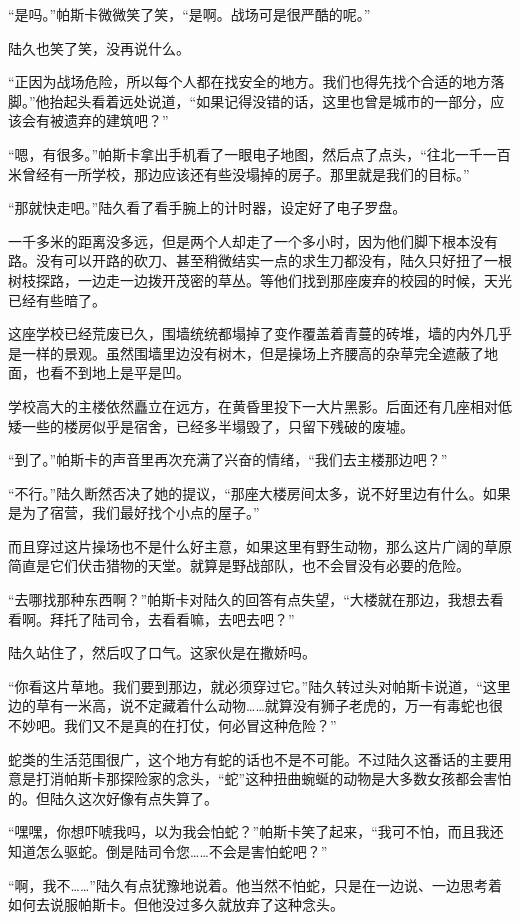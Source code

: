 “是吗。”帕斯卡微微笑了笑，“是啊。战场可是很严酷的呢。”

陆久也笑了笑，没再说什么。

“正因为战场危险，所以每个人都在找安全的地方。我们也得先找个合适的地方落脚。”他抬起头看着远处说道，“如果记得没错的话，这里也曾是城市的一部分，应该会有被遗弃的建筑吧？”

“嗯，有很多。”帕斯卡拿出手机看了一眼电子地图，然后点了点头，“往北一千一百米曾经有一所学校，那边应该还有些没塌掉的房子。那里就是我们的目标。”

“那就快走吧。”陆久看了看手腕上的计时器，设定好了电子罗盘。

一千多米的距离没多远，但是两个人却走了一个多小时，因为他们脚下根本没有路。没有可以开路的砍刀、甚至稍微结实一点的求生刀都没有，陆久只好扭了一根树枝探路，一边走一边拨开茂密的草丛。等他们找到那座废弃的校园的时候，天光已经有些暗了。

这座学校已经荒废已久，围墙统统都塌掉了变作覆盖着青蔓的砖堆，墙的内外几乎是一样的景观。虽然围墙里边没有树木，但是操场上齐腰高的杂草完全遮蔽了地面，也看不到地上是平是凹。

学校高大的主楼依然矗立在远方，在黄昏里投下一大片黑影。后面还有几座相对低矮一些的楼房似乎是宿舍，已经多半塌毁了，只留下残破的废墟。

“到了。”帕斯卡的声音里再次充满了兴奋的情绪，“我们去主楼那边吧？”

“不行。”陆久断然否决了她的提议，“那座大楼房间太多，说不好里边有什么。如果是为了宿营，我们最好找个小点的屋子。”

而且穿过这片操场也不是什么好主意，如果这里有野生动物，那么这片广阔的草原简直是它们伏击猎物的天堂。就算是野战部队，也不会冒没有必要的危险。

“去哪找那种东西啊？”帕斯卡对陆久的回答有点失望，“大楼就在那边，我想去看看啊。拜托了陆司令，去看看嘛，去吧去吧？”

陆久站住了，然后叹了口气。这家伙是在撒娇吗。

“你看这片草地。我们要到那边，就必须穿过它。”陆久转过头对帕斯卡说道，“这里边的草有一米高，说不定藏着什么动物……就算没有狮子老虎的，万一有毒蛇也很不妙吧。我们又不是真的在打仗，何必冒这种危险？”

蛇类的生活范围很广，这个地方有蛇的话也不是不可能。不过陆久这番话的主要用意是打消帕斯卡那探险家的念头，“蛇”这种扭曲蜿蜒的动物是大多数女孩都会害怕的。但陆久这次好像有点失算了。

“嘿嘿，你想吓唬我吗，以为我会怕蛇？”帕斯卡笑了起来，“我可不怕，而且我还知道怎么驱蛇。倒是陆司令您……不会是害怕蛇吧？”

“啊，我不……”陆久有点犹豫地说着。他当然不怕蛇，只是在一边说、一边思考着如何去说服帕斯卡。但他没过多久就放弃了这种念头。

